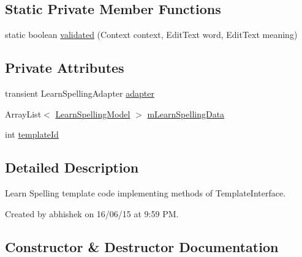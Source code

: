 \subsection*{Static Private Member Functions}
\begin{DoxyCompactItemize}
\item 
static boolean \hyperlink{classorg_1_1buildmlearn_1_1toolkit_1_1templates_1_1LearnSpellingTemplate_a5acea6370884485ccc57d4068ec43a24}{validated} (Context context, Edit\+Text word, Edit\+Text meaning)
\end{DoxyCompactItemize}
\subsection*{Private Attributes}
\begin{DoxyCompactItemize}
\item 
transient Learn\+Spelling\+Adapter \hyperlink{classorg_1_1buildmlearn_1_1toolkit_1_1templates_1_1LearnSpellingTemplate_a6ebf13ae6c906777089b2b4686139a2a}{adapter}
\item 
Array\+List$<$ \hyperlink{classorg_1_1buildmlearn_1_1toolkit_1_1templates_1_1LearnSpellingModel}{Learn\+Spelling\+Model} $>$ \hyperlink{classorg_1_1buildmlearn_1_1toolkit_1_1templates_1_1LearnSpellingTemplate_a81318e22742d557d80102eafc05a4548}{m\+Learn\+Spelling\+Data}
\item 
int \hyperlink{classorg_1_1buildmlearn_1_1toolkit_1_1templates_1_1LearnSpellingTemplate_a9a0737d2b579527b9d375518b9097014}{template\+Id}
\end{DoxyCompactItemize}


\subsection{Detailed Description}
Learn Spelling template code implementing methods of Template\+Interface. 

Created by abhishek on 16/06/15 at 9\+:59 PM. 

\subsection{Constructor \& Destructor Documentation}
